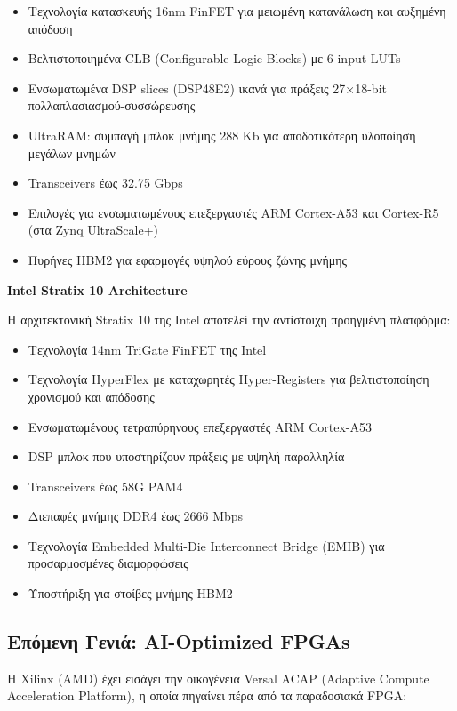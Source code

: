 \begin{itemize}
  \item Τεχνολογία κατασκευής 16nm FinFET για μειωμένη κατανάλωση και αυξημένη απόδοση
  \item Βελτιστοποιημένα CLB (Configurable Logic Blocks) με 6-input LUTs
  \item Ενσωματωμένα DSP slices (DSP48E2) ικανά για πράξεις 27×18-bit πολλαπλασιασμού-συσσώρευσης
  \item UltraRAM: συμπαγή μπλοκ μνήμης 288 Kb για αποδοτικότερη υλοποίηση μεγάλων μνημών
  \item Transceivers έως 32.75 Gbps
  \item Επιλογές για ενσωματωμένους επεξεργαστές ARM Cortex-A53 και Cortex-R5 (στα Zynq UltraScale+)
  \item Πυρήνες HBM2 για εφαρμογές υψηλού εύρους ζώνης μνήμης
\end{itemize}

\textbf{Intel Stratix 10 Architecture}

Η αρχιτεκτονική Stratix 10 της Intel αποτελεί την αντίστοιχη προηγμένη πλατφόρμα:

\begin{itemize}
  \item Τεχνολογία 14nm TriGate FinFET της Intel
  \item Τεχνολογία HyperFlex με καταχωρητές Hyper-Registers για βελτιστοποίηση χρονισμού και απόδοσης
  \item Ενσωματωμένους τετραπύρηνους επεξεργαστές ARM Cortex-A53
  \item DSP μπλοκ που υποστηρίζουν πράξεις με υψηλή παραλληλία
  \item Transceivers έως 58G PAM4
  \item Διεπαφές μνήμης DDR4 έως 2666 Mbps
  \item Τεχνολογία Embedded Multi-Die Interconnect Bridge (EMIB) για προσαρμοσμένες διαμορφώσεις
  \item Υποστήριξη για στοίβες μνήμης HBM2
\end{itemize}

\subsection{Επόμενη Γενιά: AI-Optimized FPGAs}

Η Xilinx (AMD) έχει εισάγει την οικογένεια Versal ACAP (Adaptive Compute Acceleration Platform), η οποία πηγαίνει πέρα από τα παραδοσιακά FPGA:

